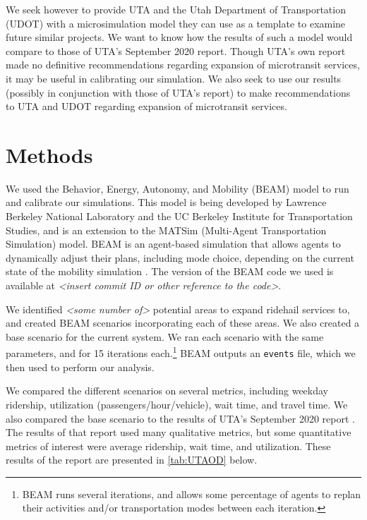 \documentclass[3p, authoryear]{elsarticle} %
\begin{document}
We seek however to provide UTA and the Utah Department of Transportation (UDOT) with a microsimulation model they can use as a template to examine future similar projects.
We want to know how the results of such a model would compare to those of UTA's September 2020 report.
Though UTA's own report made no definitive recommendations regarding expansion of microtransit services, it may be useful in calibrating our simulation.
We also seek to use our results (possibly in conjunction with those of UTA's report) to make recommendations to UTA and UDOT regarding expansion of microtransit services.

\hypertarget{methods}{%
\section{Methods}\label{methods}}

We used the Behavior, Energy, Autonomy, and Mobility (BEAM) model to run and calibrate our simulations.
This model is being developed by Lawrence Berkeley National Laboratory and the UC Berkeley Institute for Transportation Studies, and is an extension to the MATSim (Multi-Agent Transportation Simulation) model.
BEAM is an agent-based simulation that allows agents to dynamically adjust their plans, including mode choice, depending on the current state of the mobility simulation \citep{beamdocs}.
The version of the BEAM code we used is available at \emph{\textless insert commit ID or other reference to the code\textgreater{}}.

We identified \emph{\textless some number of\textgreater{}} potential areas to expand ridehail services to, and created BEAM scenarios incorporating each of these areas.
We also created a base scenario for the current system.
We ran each scenario with the same parameters, and for 15 iterations each.\footnote{BEAM runs several iterations, and allows some percentage of agents to replan their activities and/or transportation modes between each iteration.}
BEAM outputs an \texttt{events} file, which we then used to perform our analysis.

We compared the different scenarios on several metrics, including weekday ridership, utilization (passengers/hour/vehicle), wait time, and travel time.
We also compared the base scenario to the results of UTA's September 2020 report \citep{UTAreport}.
The results of that report used many qualitative metrics, but some quantitative metrics of interest were average ridership, wait time, and utilization. These results of the report are presented in \ref{tab:UTAOD} below.
\end{document}

